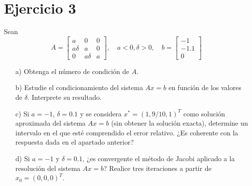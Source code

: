 
\section*{Ejercicio 3}
Sean
\[
A = \begin{bmatrix} a & 0 & 0 \\ a\delta & a & 0 \\ 0 & a\delta & a \end{bmatrix}, \quad a < 0, \delta > 0, \quad b = \begin{bmatrix} -1 \\ -1.1 \\ 0 \end{bmatrix}
\]
\begin{enumerate}
    \item[a)] Obtenga el número de condición de $A$.
    \item[b)] Estudie el condicionamiento del sistema $Ax = b$ en función de los valores de $\delta$. Interprete su resultado.
    \item[c)] Si $a = -1$, $\delta = 0.1$ y se considera $x^* = (1, 9/10, 1)^T$ como solución aproximada del sistema $Ax = b$ (sin obtener la solución exacta), determine un intervalo en el que esté comprendido el error relativo. ¿Es coherente con la respuesta dada en el apartado anterior?
    \item[d)] Si $a = -1$ y $\delta = 0.1$, ¿es convergente el método de Jacobi aplicado a la resolución del sistema $Ax = b$? Realice tres iteraciones a partir de $x_0 = (0, 0, 0)^T$.
\end{enumerate}
